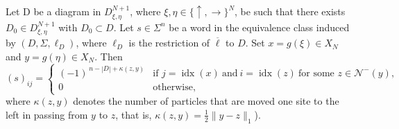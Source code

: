 \documentclass[10pt,a4paper]{amsart}
\begin{document}
\begin{lemma}
Let D be a diagram in $D_{\xi,\eta}^{N+1}$, where $\xi,\eta\in\{\uparrow,\rightarrow\}^N$, be such that there exists $D_0\in D_{\xi,\eta}^{N+1}$ with $D_0\subset D$. Let $s\in\Sigma^n$ be a word in the equivalence class induced by $(D,\Sigma,\ell_D)$, where $\ell_D$ is the restriction of $\overline{\ell}$ to $D$. Set $x=g(\xi)\in X_N$ and $y=g(\eta)\in X_N$. Then
\[
(s)_{ij}=
\begin{cases}
(-1)^{\,n-|D|+\kappa(z,y)}
& \text{if } j=\operatorname{idx}(x)\ \text{and}\ i=\operatorname{idx}(z)\ \text{for some } z\in \mathcal{N}^-(y),\\[4pt]
0 & \text{otherwise},
\end{cases}
\]
where $\kappa(z,y)$ denotes the number of particles that are moved one site to the left in passing from $y$ to $z$, that is, $\kappa(z,y)=\frac12\|y-z\|_1$).
\end{lemma}
\end{document}
